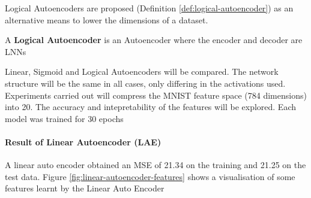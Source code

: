 Logical Autoencoders are proposed (Definition \ref{def:logical-autoencoder}) as an alternative means to lower the dimensions of a dataset.

\begin{definition} \label{def:logical-autoencoder}
	A \textbf{Logical Autoencoder} is an Autoencoder where the encoder and decoder are LNNs
\end{definition}

Linear, Sigmoid and Logical Autoencoders will be compared. The network structure will be the same in all cases, only differing in the activations used. Experiments carried out will compress the MNIST feature space (784 dimensions) into 20. The accuracy and intepretability of the features will be explored. Each model was trained for 30 epochs

\paragraph{Result of Linear Autoencoder (LAE)}
A linear auto encoder obtained an MSE of 21.34 on the training and 21.25 on the test data. Figure \ref{fig:linear-autoencoder-features} shows a visualisation of some features learnt by the Linear Auto Encoder

